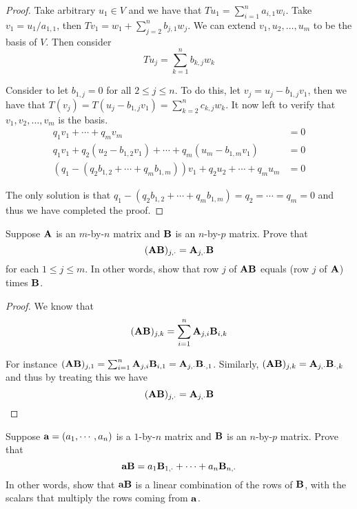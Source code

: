 \documentclass{extarticle}
\begin{document}
\begin{proof}
Take arbitrary \(u_1 \in V\) and we have that \(T u_1 = \sum_{i=1}^{n} a_{i, 1} w_i\). Take 
\(v_1 = u_1 / a_{1, 1}\), then \(T v_1 = w_1 + \sum_{j=2}^{n} b_{j, 1} w_j\). We can extend 
\(v_1, u_2, \ldots, u_m\) to be the basis of \(V\). Then consider 
\[T u_j = \sum_{k=1}^{n}b_{k, j} w_k\]

Consider to let \(b_{1, j} = 0\) for all \( 2 \leq j \leq n\). To do this, let \(v_j = u_j 
- b_{1, j} v_1\), then we have that \(T(v_j) = T(u_j - b_{1, j} v_1) = \sum_{k=2}^{n} c_{k, j} w_k\). 
It now left to verify that \(v_1, v_2, \ldots, v_m\) is the basis. 
\begin{align*}
    q_1 v_1 + \cdots + q_m v_m &= 0 \\ 
    q_1 v_1 + q_2(u_2 - b_{1, 2} v_1) + \cdots + q_m (u_m - b_{1, m} v_1) &= 0 \\ 
    (q_1 - (q_2 b_{1, 2} + \cdots + q_m b_{1, m})) v_1 + q_2 u_2 + \cdots + q_m u_m &= 0 
\end{align*}

The only solution is that \(q_1 - (q_2 b_{1,2} + \cdots + q_m b_{1, m}) = q_2 = \cdots = q_m = 0\)
and thus we have completed the proof. 
\end{proof}

\begin{problem}{8}
    Suppose \(\mathbf{A}\) is an \(m\)-by-\(n\) matrix and \(\mathbf{B}\) is an \(n\)-by-\(p\) matrix. Prove that 
    \[(\mathbf{A} \mathbf{B})_{j, \cdot} = \mathbf{A}_{j, \cdot} \mathbf{B}\]
    for each \(1 \leq j \leq m \). In other words, show that row \(j\) of \(\mathbf{A} \mathbf{B}\) equals 
    (row \(j\) of \(\mathbf{A}\)) times \(\mathbf{B}\). 
\end{problem}

\begin{proof}
We know that 
\[(\mathbf{A} \mathbf{B})_{j, k} = \sum_{i=1}^{n}\mathbf{A}_{j, i} \mathbf{B}_{i, k}\]

For instance \((\mathbf{A} \mathbf{B})_{j, 1} = \sum_{i=1}^{n}\mathbf{A}_{j, i} \mathbf{B}_{i, 1} = \mathbf{A}_{j, \cdot} \mathbf{B}_{\cdot, 1}\). 
Similarly, \((\mathbf{A} \mathbf{B})_{j, k} = \mathbf{A}_{j, \cdot} \mathbf{B}_{\cdot, k}\) and thus by treating this we have 
\[(\mathbf{A} \mathbf{B})_{j, \cdot} = \mathbf{A}_{j, \cdot} \mathbf{B}\] 
\end{proof}

\begin{problem}{9}
    Suppose \(\mathbf{a} = (a_1, \cdots, a_n)\) is a \(1\)-by-\(n\) matrix and \(\mathbf{B}\) is an \(n\)-by-\(p\) matrix. 
    Prove that 
    \[\mathbf{a} \mathbf{B} = a_1 \mathbf{B}_{1, \cdot} + \cdots + a_n \mathbf{B}_{n, \cdot}\]
    In other words, show that \(\mathbf{a} \mathbf{B}\) is a linear combination of the rows of \(\mathbf{B}\), 
    with the scalars that multiply the rows coming from \(\mathbf{a}\).
\end{problem}
\end{document}
